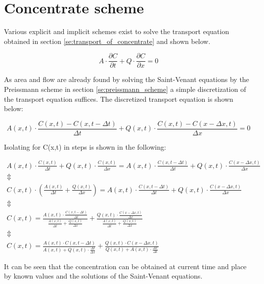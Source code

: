 \section{Concentrate scheme}\label{sec:concentrate}

Various explicit and implicit schemes exist to solve the transport equation obtained in section \ref{se:transport_of_concentrate} and shown below.

\begin{equation}
A \cdot \frac{\partial C}{\partial t} + Q \cdot \frac{\partial C}{\partial x} = 0
\label{eq:transport_sim}
\end{equation}

As area and flow are already found by solving the Saint-Venant equations by the Preissmann scheme in section \ref{se:preissmann_scheme} a simple discretization of the transport equation suffices.
The discretized transport equation is shown below:

\begin{equation}
	A(x,t) \cdot \frac{C(x,t) - C(x,t-\Delta t)}{\Delta t} + Q(x,t) \cdot \frac{C(x,t)-C(x-\Delta x,t)}{\Delta x} = 0
\end{equation}

Isolating for C(x,t) in steps is shown in the following:

\begin{equation}
\begin{array}{l}
	A(x,t) \cdot \frac{C(x,t)}{\Delta t} + Q(x,t) \cdot \frac{C(x,t)}{\Delta x} = A(x,t) \cdot \frac{C(x,t-\Delta t)}{\Delta t} + Q(x,t) \cdot \frac{C(x-\Delta x,t)}{\Delta x} \\

	\Updownarrow \\

C(x,t) \cdot \left( \frac{A(x,t)}{\Delta t} + \frac{Q(x,t)}{\Delta x} \right) = A(x,t) \cdot \frac{C(x,t-\Delta t)}{\Delta t} + Q(x,t) \cdot \frac{C(x-\Delta x,t)}{\Delta x} \\

\Updownarrow \\

C(x,t) = \frac{ A(x,t) \cdot \frac{C(x,t-\Delta t)}{\Delta t}}{\frac{A(x,t)}{\Delta t} + \frac{Q(x,t)}{\Delta x}}   +   \frac{ Q(x,t) \cdot \frac{C(x-\Delta x,t)}{\Delta x}}{\frac{A(x,t)}{\Delta t} + \frac{Q(x,t)}{\Delta x}} \\

\Updownarrow \\

C(x,t) = \frac{ A(x,t) \cdot C(x,t-\Delta t) }{ A(x,t)+Q(x,t) \cdot \frac{\Delta t}{ \Delta x} } + \frac{Q(x,t) \cdot C(x-\Delta x,t)}{Q(x,t)+A(x,t)\cdot \frac{\Delta x}{\Delta t}}

\end{array}	
\end{equation}

It can be seen that the concentration can be obtained at current time and place by known values and the solutions of the Saint-Venant equations.

